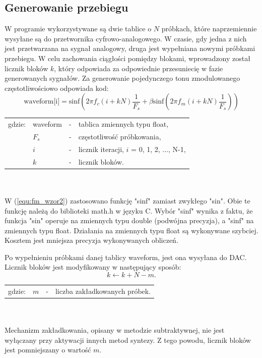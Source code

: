 \subsection{Generowanie przebiegu} \label{sec:fm_gen_przeb}
W programie wykorzystywane są dwie tablice o $N$ próbkach, które naprzemiennie wysyłane są do przetwornika cyfrowo-analogowego. W czasie, gdy jedna z nich jest przetwarzana na sygnał analogowy, druga jest wypełniana nowymi próbkami przebiegu. W celu zachowania ciągłości pomiędzy blokami, wprowadzony został licznik bloków $k$, który odpowiada za odpowiednie przesuniecię w fazie generowanych sygnałów. Za generowanie pojedynczego tonu zmodulowanego częstotliwościowo odpowiada kod:
\begin{equation} \label{equ:fm_wzor2}
\text{waveform[i]} = \text{sinf}(2\pi f_c(i+kN)\frac{1}{F_s} + \beta \text{sinf}(2 \pi f_m(i+kN)\frac{1}{F_s}))
\end{equation}
\begin{tabular}{ l l l l}
	gdzie: & waveform &  - & tablica zmiennych typu float, \\
	&	$F_s$ & - & częstotliwość próbkowania,\\
	&	$i$ & - &  licznik iteracji, $i$ = 0, 1, 2, ..., N-1,\\
	&	$k$ & - &  licznik bloków.\\
\end{tabular} \\ \\
W (\ref{equ:fm_wzor2}) zastosowano funkcję "sinf" zamiast zwykłego "sin". Obie te funkcję należą do biblioteki math.h w języku C. Wybór "sinf" wynika z faktu, że funkcja "sin" operuje na zmiennych typu double (podwójna precyzja), a "sinf" na zmiennych typu float. Działania na zmiennych typu float są wykonywane szybciej. Kosztem jest mniejsza precyzja wykonywanych obliczeń.

Po wypełnieniu próbkami danej tablicy waveform, jest ona wysyłana do DAC. Licznik bloków jest modyfikowany w następujący sposób:
\begin{equation} \label{equ:fm_wzor3}
k \gets k + N - m.
\end{equation}
\begin{tabular}{ l l l l}
	gdzie: & $m$  &  - & liczba zakładkowanych próbek. \\
\end{tabular} \\ \\
Mechanizm zakładkowania, opisany w metodzie subtraktywnej, nie jest wyłączany przy aktywacji innych metod syntezy. Z tego powodu, licznik bloków jest pomniejszany o wartość $m$.
